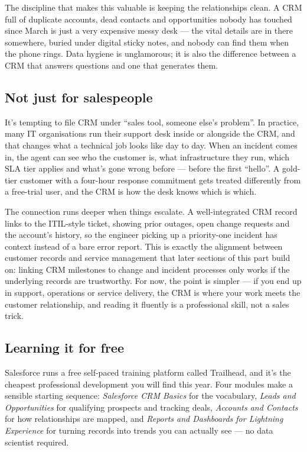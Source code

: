 The discipline that makes this valuable is keeping the relationships clean. A CRM full of duplicate accounts, dead contacts and opportunities nobody has touched since March is just a very expensive messy desk — the vital details are in there somewhere, buried under digital sticky notes, and nobody can find them when the phone rings. Data hygiene is unglamorous; it is also the difference between a CRM that answers questions and one that generates them. \autocite{salesforce-crm}



\subsection{Not just for salespeople}


It's tempting to file CRM under ``sales tool, someone else's problem''. In practice, many IT organisations run their support desk inside or alongside the CRM, and that changes what a technical job looks like day to day. When an incident comes in, the agent can see who the customer is, what infrastructure they run, which SLA tier applies and what's gone wrong before — before the first ``hello''. A gold-tier customer with a four-hour response commitment gets treated differently from a free-trial user, and the CRM is how the desk knows which is which.


The connection runs deeper when things escalate. A well-integrated CRM record links to the ITIL-style ticket, showing prior outages, open change requests and the account's history, so the engineer picking up a priority-one incident has context instead of a bare error report. This is exactly the alignment between customer records and service management that later sections of this part build on: linking CRM milestones to change and incident processes only works if the underlying records are trustworthy. For now, the point is simpler — if you end up in support, operations or service delivery, the CRM is where your work meets the customer relationship, and reading it fluently is a professional skill, not a sales trick.



\subsection{Learning it for free}


Salesforce runs a free self-paced training platform called Trailhead, and it's the cheapest professional development you will find this year. Four modules make a sensible starting sequence: \emph{Salesforce CRM Basics} for the vocabulary, \emph{Leads and Opportunities} for qualifying prospects and tracking deals, \emph{Accounts and Contacts} for how relationships are mapped, and \emph{Reports and Dashboards for Lightning Experience} for turning records into trends you can actually see — no data scientist required.


